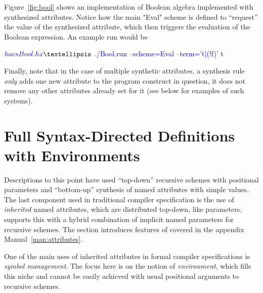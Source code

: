 \documentclass[12pt]{article} %
\begin{document}
\begin{example}\label{ex:bool}
  Figure~\ref{fig:bool} shows an implementation of Boolean algebra implemented with synthesized
  attributes. Notice how the main "Eval" scheme is defined to ``request'' the value of the
  synthesized attribute, which then triggers the evaluation of the Boolean expression. An example
  run would be
  \begin{code}[commandchars=\\\{\}]
$ \textcolor{blue}{hacs Bool.hx}
…
$ \textcolor{blue}{./Bool.run --scheme=Eval --term='t|(!f)'}
 t
  \end{code}
\end{example}

Finally, note that in the case of multiple synthetic attributes, a synthesis rule \emph{only} adds
one new attribute to the program construct in question, it does not remove any other attributes
already set for it (see below for examples of such systems). %


\section{Full Syntax-Directed Definitions with Environments}
\label{sec:sdd}

Descriptions to this point have used ``top-down'' recursive schemes with positional parameters and
``bottom-up'' synthesis of named attributes with simple values. The last component used in
traditional compiler specification is the use of \emph{inherited} named attributes, which are
distributed top-down, like parameters. \HAX supports this with a hybrid combination of implicit
named parameters for recursive schemes. The section introduces features of \HAX covered in the
appendix Manual~\ref{man:attributes}.

One of the main uses of inherited attributes in formal compiler specifications is \emph{symbol
  management}. The focus here is on the \HAX notion of \emph{environment}, which fills this niche
and cannot be easily achieved with usual positional arguments to recursive schemes.
\end{document}
